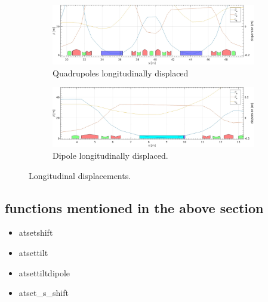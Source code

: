 \begin{figure}[!thb]
	\centering
	\begin{subfigure}[b]{\textwidth}
        \includegraphics[width=0.98\textwidth]{./images/LongitudinalDisplacement/DeltaSQuadZoom.jpg}
	\caption{Quadrupoles longitudinally displaced}
        \label{fig:quadsDs}
    \end{subfigure}
		
	\begin{subfigure}[b]{\textwidth}
        \includegraphics[width=0.98\textwidth]{./images/LongitudinalDisplacement/DeltaSDipZoom.jpg}
	\caption{Dipole longitudinally displaced.}
        \label{fig:dipds}
    \end{subfigure}
	\caption{Longitudinal displacements.}
	\label{fig:dipquadrot}
\end{figure}


\subsection*{functions mentioned in the above section}
\begin{itemize}
	\item atsetshift
	\item atsettilt
	\item atsettiltdipole 
	\item atset_s_shift
\end{itemize}

\clearpage

